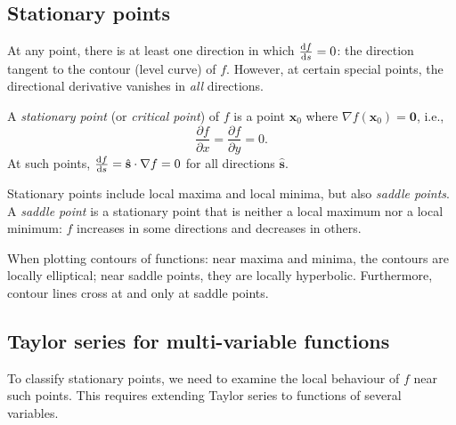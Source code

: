 \documentclass[a4paper]{article}
\begin{document}
\subsection{Stationary points}
\begin{remark}[Motivation]
  At any point, there is at least one direction in which $\frac{\mathrm{d} f}{\mathrm{d} s} = 0$: the direction tangent to the contour (level curve) of $f$. However, at certain special points, the directional derivative vanishes in \emph{all} directions.
\end{remark}

\begin{defi}
  A \emph{stationary point} (or \emph{critical point}) of $f$ is a point $\mathbf{x}_0$ where $\nabla f(\mathbf{x}_0) = \mathbf{0}$, i.e.,
  \[
    \frac{\partial f}{\partial x} = \frac{\partial f}{\partial y} = 0.
  \]
  At such points, $\frac{\mathrm{d} f}{\mathrm{d} s} = \hat{\mathbf{s}} \cdot \nabla f = 0$ for all directions $\hat{\mathbf{s}}$.
\end{defi}

\begin{defi}
  Stationary points include local maxima and local minima, but also \emph{saddle points}. A \emph{saddle point} is a stationary point that is neither a local maximum nor a local minimum: $f$ increases in some directions and decreases in others.
  \begin{center}
  \end{center}
\end{defi}

\begin{remark}
  When plotting contours of functions: near maxima and minima, the contours are locally elliptical; near saddle points, they are locally hyperbolic. Furthermore, contour lines cross at and only at saddle points.
\end{remark}

\subsection{Taylor series for multi-variable functions}
\begin{remark}[Motivation]
  To classify stationary points, we need to examine the local behaviour of $f$ near such points. This requires extending Taylor series to functions of several variables.
\end{remark}
\end{document}
